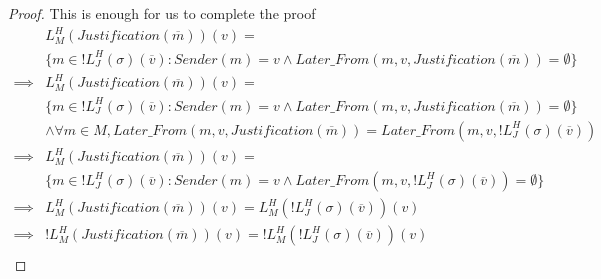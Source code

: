 \begin{proof}
This is enough for us to complete the proof
\begin{align}
          &L^H_M(Justification(\overline{m}))(v) = \\
          &\{m \in !L^H_J(\sigma)(\overline{v}) : Sender(m) = v \land Later\_From(m,v,Justification(\overline{m})) = \emptyset\}\\
  \implies&L^H_M(Justification(\overline{m}))(v) = \\
          &\{m \in !L^H_J(\sigma)(\overline{v}) : Sender(m) = v \land Later\_From(m,v,Justification(\overline{m})) = \emptyset\}\\
          &\land \forall m \in M, Later\_From(m,v,Justification(\overline{m})) = Later\_From(m,v,!L^H_J(\sigma)(\overline{v})) \\
  \implies&L^H_M(Justification(\overline{m}))(v) = \\
          &\{m \in !L^H_J(\sigma)(\overline{v}) : Sender(m) = v \land Later\_From(m,v,!L^H_J(\sigma)(\overline{v})) = \emptyset\}\\
  \implies&L^H_M(Justification(\overline{m}))(v) = L^H_M(!L^H_J(\sigma)(\overline{v}))(v) \\
  \implies&!L^H_M(Justification(\overline{m}))(v) = !L^H_M(!L^H_J(\sigma)(\overline{v}))(v) \\
\end{align}


\end{proof}
